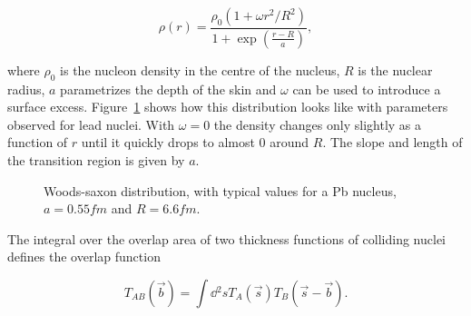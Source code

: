 \begin{equation}
\rho\left( r\right) = \frac{\rho_0 \left(1+\omega r^2 / R^2\right)}{1+\exp \left(\frac{r-R}{a}\right)},
\end{equation}


\noindent where $\rho_0$ is the nucleon density in the centre of the nucleus, $R$ is the nuclear radius, $a$ parametrizes the depth of the skin and $\omega$ can be used to introduce a surface excess. Figure~\ref{fig:woodssaxon} shows how this distribution looks like with parameters observed for lead nuclei. With $\omega=0$ the density changes only slightly as a function of $r$ until it quickly drops to almost 0 around $R$. The slope and length of the transition region is given by $a$. 

\begin{figure}
\centering
{}
\caption{Woods-saxon distribution, with typical values for a Pb nucleus, $a=0.55\unit{fm}$ and $R=6.6\unit{fm}$.}
\label{fig:woodssaxon}
\end{figure}


The integral over the overlap area of two thickness functions of colliding nuclei defines the overlap function 

\begin{equation}
T_{AB}\left(\vec b\right)=\int \dd{^2s} T_A\left(\vec s\right) T_B\left(\vec s - \vec b\right).
\end{equation}

